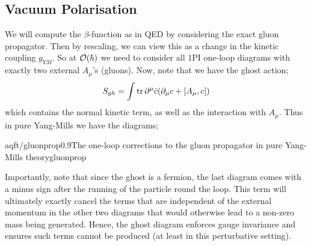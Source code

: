 \subsection{Vacuum Polarisation}
We will compute the $\beta$-function as in QED by considering the exact gluon propagator. Then by rescaling, we can view this as a change in the kinetic coupling $g_{YM}$. So at $\mathcal{O}(\hbar)$ we need to consider all $1$PI one-loop diagrams with exactly two external $A_\mu$'s (gluons). Now, note that we have the ghost action;
\begin{equation*}
S_{gh} = \int{\tr \del^\mu \bar{c}\left(\del_\mu c + [A_\mu, c]\right)}
\end{equation*}
which contains the normal kinetic term, as well as the interaction with $A_\mu$. Thus in pure Yang-Mills we have the diagrams;
\begin{mygraphic}{aqft/gluonprop}{0.9}{The one-loop corrections to the gluon propagator in pure Yang-Mills theory}{gluonprop}\end{mygraphic}
Importantly, note that since the ghost is a fermion, the last diagram comes with a minus sign after the running of the particle round the loop. This term will ultimately exactly cancel the terms that are independent of the external momentum in the other two diagrams that would otherwise lead to a non-zero mass being generated. Hence, the ghost diagram enforces gauge invariance and ensures such terms cannot be produced (at least in this perturbative setting).
